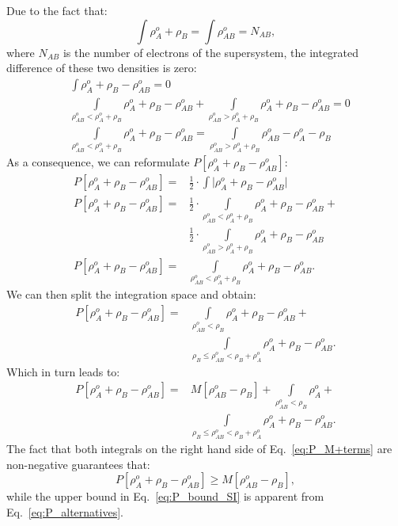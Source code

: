 \documentclass[amsmath,amssymb,preprint,aip,jcp]{revtex4-1}
\begin{document}
Due to the fact that:
\begin{equation}
 \int \rho^{o}_A + \rho_B = \int \rho_{AB}^o = N_{AB},
\end{equation}
where $N_{AB}$ is the number of electrons of the supersystem, the integrated difference of these two densities is zero:
\begin{align}
 & \int \rho^{o}_A + \rho_B - \rho_{AB}^o = 0 \\ \nonumber
 & \int\limits_{\rho_{AB}^o <\rho^{o}_A + \rho_B}\rho^{o}_A + \rho_B - \rho_{AB}^o + \int\limits_{\rho_{AB}^o > \rho^{o}_A + \rho_B}\rho^{o}_A + \rho_B - \rho_{AB}^o = 0 \\ \nonumber
 & \int\limits_{\rho_{AB}^o < \rho^{o}_A + \rho_B}\rho^{o}_A + \rho_B - \rho_{AB}^o = \int\limits_{\rho_{AB}^o > \rho^{o}_A + \rho_B}\rho_{AB}^o - \rho^{o}_A - \rho_B 
\end{align}
As a consequence, we can reformulate $P[\rho^{o}_A + \rho_B - \rho_{AB}^o]$:
\begin{align}\label{eq:P_alternatives}
P[\rho^{o}_A + \rho_B - \rho_{AB}^o] = & \frac{1}{2} \cdot \int \vert \rho^{o}_A + \rho_B - \rho_{AB}^o \vert \\ \nonumber
P[\rho^{o}_A + \rho_B - \rho_{AB}^o] = & \frac{1}{2} \cdot \int\limits_{\rho_{AB}^o <\rho^{o}_A + \rho_B}\rho^{o}_A + \rho_B - \rho_{AB}^o + \\ \nonumber
 & \frac{1}{2} \cdot \int\limits_{\rho_{AB}^o > \rho^{o}_A + \rho_B}\rho^{o}_A + \rho_B - \rho_{AB}^o \\ \nonumber
P[\rho^{o}_A + \rho_B - \rho_{AB}^o] = & \int\limits_{\rho_{AB}^o <\rho^{o}_A + \rho_B}\rho^{o}_A + \rho_B - \rho_{AB}^o.
\end{align}
We can then split the integration space and obtain:
\begin{align}
P[\rho^{o}_A + \rho_B - \rho_{AB}^o] = & \int\limits_{\rho_{AB}^o < \rho_B}\rho^{o}_A + \rho_B - \rho_{AB}^o + \\ \nonumber
 & \int\limits_{\rho_B \leq \rho_{AB}^o < \rho_B + \rho^{o}_A}\rho^{o}_A + \rho_B - \rho_{AB}^o.
\end{align}
Which in turn leads to:
\begin{align}\label{eq:P_M+terms}
 P[\rho^{o}_A + \rho_B - \rho_{AB}^o] =  &M[\rho_{AB}^o - \rho_B] + \int\limits_{\rho_{AB}^o < \rho_B}\rho^{o}_A + \\ \nonumber
 & \int\limits_{\rho_B \leq \rho_{AB}^o < \rho_B + \rho^{o}_A}\rho^{o}_A + \rho_B - \rho_{AB}^o.
\end{align}
The fact that both integrals on the right hand side of Eq.~\ref{eq:P_M+terms} are non-negative guarantees that:
\begin{equation}
 P[\rho^{o}_A + \rho_B - \rho_{AB}^o] \geq M[\rho_{AB}^o - \rho_B],
\end{equation}
while the upper bound in Eq.~\ref{eq:P_bound_SI} is apparent from Eq.~\ref{eq:P_alternatives}.
\end{document}
